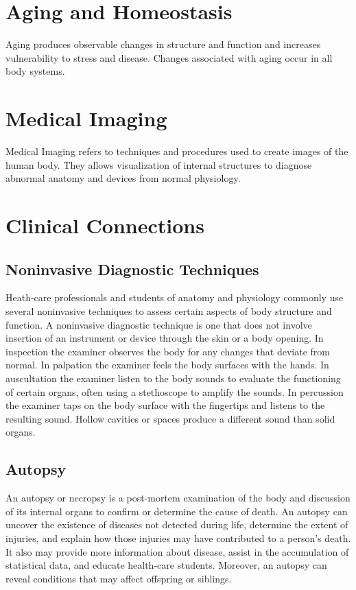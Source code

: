 \documentclass[12pt]{article}
\begin{document}
\section{Aging and Homeostasis}
\hspace{1cm}
Aging produces observable changes in structure and function and increases vulnerability to stress and disease. Changes associated with aging occur in all body systems.

\section{Medical Imaging}
\hspace{1cm}
Medical Imaging refers to techniques and procedures used to create images of the human  body. They allows visualization of internal structures to diagnose abnormal anatomy and devices from normal physiology.
\clearpage


\section{Clinical Connections}
\subsection{Noninvasive Diagnostic Techniques}
\hspace{1cm}
Heath-care professionals and students of anatomy and physiology commonly use several noninvasive techniques to assess certain aspects of body structure and function. A noninvasive  diagnostic technique is one that does not involve insertion of an instrument or device through the skin or a body opening. In inspection the examiner observes the body for any changes that deviate from normal. In palpation the examiner feels the body surfaces with the hands. In auscultation the examiner listen to the body sounds to evaluate the functioning of certain organs, often using a stethoscope to amplify the sounds. In percussion the examiner taps on the body surface with the fingertips and listens to the resulting sound. Hollow cavities or spaces produce a different sound than solid organs.

\subsection{Autopsy}
\hspace{1cm}
An autopsy or necropsy is a post-mortem examination of the body and discussion of its internal organs to confirm or determine the cause of death. An autopsy can uncover the existence of diseases not detected during life, determine the extent of injuries, and explain how those injuries may have contributed to a person's death. It also may provide more information about disease, assist in the accumulation of statistical data, and educate health-care students. Moreover, an autopsy can reveal conditions that may affect offspring or siblings.
\end{document}

